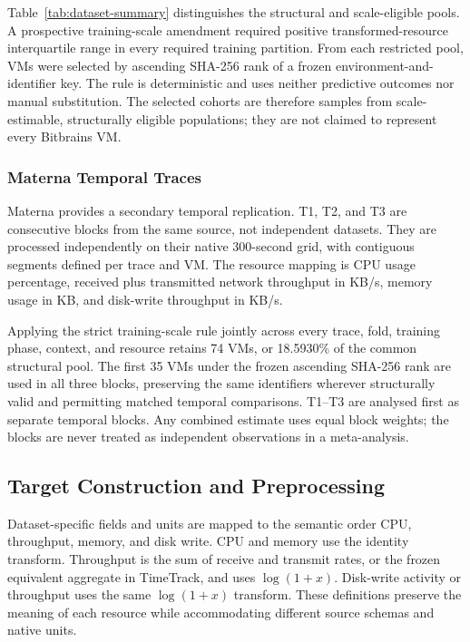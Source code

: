 \documentclass[a4paper,fleqn]{cas-dc}
\begin{document}
Table~\ref{tab:dataset-summary} distinguishes the structural and scale-eligible
pools. A prospective training-scale amendment required positive
transformed-resource interquartile range in every required training partition.
From each restricted pool, VMs were selected by ascending
SHA-256 rank of a frozen environment-and-identifier key.  The rule is
deterministic and uses neither predictive outcomes nor manual substitution.
The selected cohorts are therefore samples from scale-estimable, structurally
eligible populations; they are not claimed to represent every Bitbrains VM.

\subsubsection{Materna Temporal Traces}
\label{sec:materna-data}

Materna provides a secondary temporal replication.  T1, T2, and T3 are
consecutive blocks from the same source, not independent datasets.  They are
processed independently on their native 300-second grid, with contiguous
segments defined per trace and VM.  The resource mapping is CPU usage
percentage, received plus transmitted network throughput in KB/s, memory usage
in KB, and disk-write throughput in KB/s.

Applying the strict training-scale rule jointly across every trace, fold, training phase,
context, and resource retains 74 VMs, or 18.5930\% of the common structural
pool.  The first 35 VMs under the frozen ascending SHA-256 rank are used in all
three blocks, preserving the same identifiers wherever structurally valid and
permitting matched temporal comparisons.  T1--T3 are analysed first as
separate temporal blocks.  Any combined estimate uses equal block weights;
the blocks are never treated as independent observations in a meta-analysis.



\subsection{Target Construction and Preprocessing}
\label{sec:preprocessing}

Dataset-specific fields and units are mapped to the semantic order CPU,
throughput, memory, and disk write.  CPU and memory use the identity transform.
Throughput is the sum of receive and transmit rates, or the frozen equivalent
aggregate in TimeTrack, and uses $\log(1+x)$.  Disk-write activity or throughput
uses the same $\log(1+x)$ transform.  These definitions preserve the meaning of
each resource while accommodating different source schemas and native units.
\end{document}
